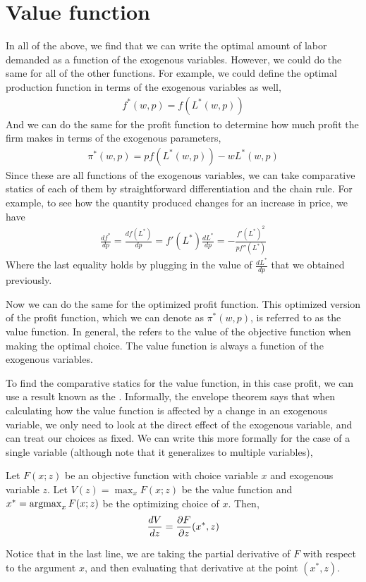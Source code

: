 \section{Value function}
In all of the above, we find that we can write the optimal amount of labor demanded as a function of the exogenous variables. However, we could do the same for all of the other functions. For example, we could define the optimal production function in terms of the exogenous variables as well,
\begin{align*}
    f^*(w, p) = f(L^*(w, p))
\end{align*}
And we can do the same for the profit function to determine how much profit the firm makes in terms of the exogenous parameters,
\begin{align*}
    \pi^*(w, p) = p f(L^*(w, p)) - w L^*(w, p)
\end{align*}
Since these are all functions of the exogenous variables, we can take comparative statics of each of them by straightforward differentiation and the chain rule. For example, to see how the quantity produced changes for an increase in price, we have
\begin{align*}
    \frac{df^*}{dp} = \frac{d f(L^*)}{dp} = f'(L^*) \frac{dL^*}{dp} = -\frac{f'(L^*)^2}{p f''(L^*)}
\end{align*}
Where the last equality holds by plugging in the value of $\frac{dL^*}{dp}$ that we obtained previously. 

Now we can do the same for the optimized profit function. This optimized version of the profit function, which we can denote as $\pi^*(w, p)$, is referred to as the value function. In general, the  refers to the value of the objective function when making the optimal choice. The value function is always a function of the exogenous variables. 

To find the comparative statics for the value function, in this case profit, we can use a result known as the . Informally, the envelope theorem says that when calculating how the value function is affected by a change in an exogenous variable, we only need to look at the direct effect of the exogenous variable, and can treat our choices as fixed. We can write this more formally for the case of a single variable (although note that it generalizes to multiple variables),

\begin{theorem*}[Envelope] \label{thm:envelope}
    Let $F(x; z)$ be an objective function with choice variable $x$ and exogenous variable $z$. Let $V(z) = \max_x F(x; z)$ be the value function and $x^* = \operatorname*{arg max}_x F(x; z)$ be the optimizing choice of $x$. Then,
    \begin{align*}
        \frac{dV}{dz} = \frac{\partial F}{\partial z}(x^*, z)
    \end{align*}
\end{theorem*}
Notice that in the last line, we are taking the partial derivative of $F$ with respect to the argument $x$, and then evaluating that derivative at the point $(x^*, z)$. 

